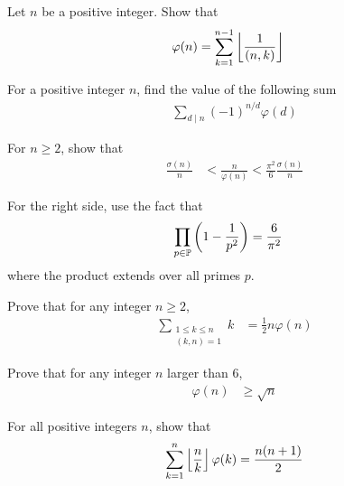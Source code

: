 \begin{problem}
	Let $n$ be a positive integer. Show that
		\begin{align*}
			\varphi(n)
				& =\sum_{k=1}^{n-1}\left\lfloor{\frac{1}{(n,k)}}\right\rfloor
		\end{align*}
\end{problem}


\begin{problem}
	For a positive integer $n$, find the value of the following sum
		\begin{align*}
			\sum\limits_{d\mid n} (-1)^{n/d} \varphi(d)
		\end{align*}
\end{problem}

\begin{problem}
	For $n \geq 2$, show that
		\begin{align*}
			\frac{\sigma(n)}{n}
				& < \frac{n}{\varphi(n)} < \frac{\pi^{2}}{6} \frac{\sigma(n)}{n}
		\end{align*}
\end{problem}

\begin{hint}
	For the right side, use the fact that
		\begin{align*}
			\prod_{p \in \mathbb P}\left(1 - \frac{1}{p^2}\right)
				& = \frac{6}{\pi^2}
		\end{align*}
	where the product extends over all primes $p$.
\end{hint}
\begin{problem}
	Prove that for any integer $n\geq 2$,
		\begin{align*}
		 \sum_{\substack{1 \leq k \leq n \\ (k,n)=1}} k
			 	& = \frac{1}{2}n\varphi(n)
		\end{align*}
\end{problem}

\begin{problem}
	Prove that for any integer $n$ larger than $6$,
		\begin{align*}
			\varphi(n)
				& \geq \sqrt n
		\end{align*}
\end{problem}

\begin{problem}
	For all positive integers $n$, show that
		\begin{align*}
			\sum_{k=1}^n\left\lfloor{\frac{n}{k}}\right\rfloor\varphi(k) = \frac{n(n+1)}{2}
		\end{align*}
\end{problem}

